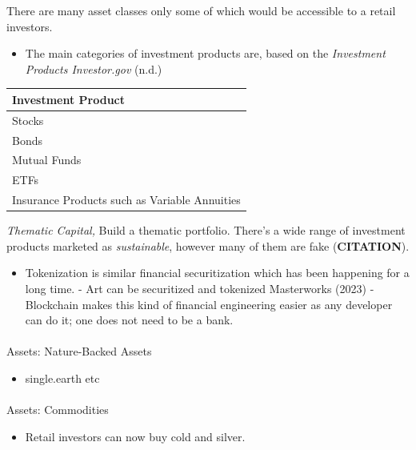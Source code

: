 \documentclass[
  letterpaper,
  DIV=11,
  numbers=noendperiod]{scrartcl}
\makeatletter
\let\oldparagraph\paragraph
\renewcommand{\paragraph}{
    \@ifstar
      \xxxParagraphStar
      \xxxParagraphNoStar
  }
\newcommand{\xxxParagraphStar}[1]{\oldparagraph*{#1}\mbox{}}
\newcommand{\xxxParagraphNoStar}[1]{\oldparagraph{#1}\mbox{}}
\providecommand{\tightlist}{%
  \setlength{\itemsep}{0pt}\setlength{\parskip}{0pt}}\usepackage{longtable,booktabs,array}
\makeatother
\begin{document}
There are many asset classes only some of which would be accessible to a
retail investors.

\begin{itemize}
\tightlist
\item
  The main categories of investment products are, based on the
  \emph{Investment {Products} {\textbar} {Investor}.gov} (n.d.)
\end{itemize}

\begin{longtable}[]{@{}l@{}}
\toprule\noalign{}
Investment Product \\
\midrule\noalign{}
\endhead
\bottomrule\noalign{}
\endlastfoot
Stocks \\
Bonds \\
Mutual Funds \\
ETFs \\
Insurance Products such as Variable Annuities \\
\end{longtable}

\emph{Thematic Capital,} Build a thematic portfolio. There's a wide
range of investment products marketed as \emph{sustainable}, however
many of them are fake (\textbf{CITATION}).

\begin{itemize}
\tightlist
\item
  Tokenization is similar financial securitization which has been
  happening for a long time. - Art can be securitized and tokenized
  Masterworks (2023) - Blockchain makes this kind of financial
  engineering easier as any developer can do it; one does not need to be
  a bank.
\end{itemize}

\paragraph{Assets: Nature-Backed
Assets}\label{assets-nature-backed-assets}

\begin{itemize}
\tightlist
\item
  single.earth etc
\end{itemize}

\paragraph{Assets: Commodities}\label{assets-commodities}

\begin{itemize}
\tightlist
\item
  Retail investors can now buy cold and silver.
\end{itemize}
\end{document}
